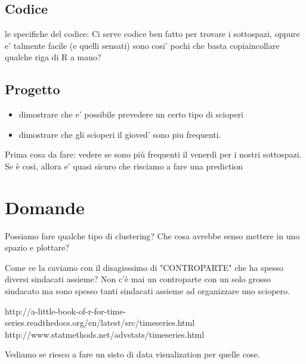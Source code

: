 \documentclass[10pt,a4paper]{article}
\begin{document}
\subsection{Codice}
le specifiche del codice:
Ci serve codice ben fatto per trovare i sottospazi, oppure e' talmente facile (e quelli sensati) sono cosi' pochi che basta copiaincollare qualche riga di R a mano?


\subsection{Progetto}
\begin{itemize}
\item dimostrare che e' possibile prevedere un certo tipo di scioperi
\item dimostrare che gli scioperi il gioved' sono piu frequenti.
\end{itemize}

Prima cosa da fare: vedere se sono più frequenti il venerdì per i nostri sottospazi. Se è così, allora e' quasi sicuro che risciamo a fare una prediction



\section{Domande}

Possiamo fare qualche tipo di clustering? Che cosa avrebbe senso mettere in uno spazio e plottare?

Come ce la caviamo con il disagisssimo di "CONTROPARTE" che ha spesso diversi sindacati assieme? Non c'è mai un controparte con un solo grosso sindacato ma sono spesso tanti sindacati assieme ad organizzare uno sciopero.

http://a-little-book-of-r-for-time-series.readthedocs.org/en/latest/src/timeseries.html
http://www.statmethods.net/advstats/timeseries.html

Vediamo se riesco a fare un sisto di data visualization per quelle cose.
\end{document}
